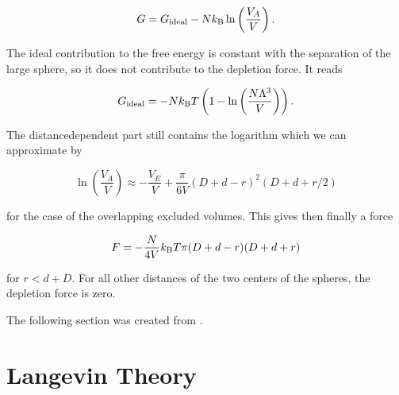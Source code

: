 \documentclass[letterpaper,10pt,english]{sphinxmanual}
\begin{document}
\sphinxAtStartPar
\begin{equation}
G=G_{\rm ideal}-Nk_{\rm B}\ln\left (\frac{V_{A}}{V}\right).
\end{equation}

\sphinxAtStartPar
The ideal contribution to the free energy is constant with the separation of the large sphere, so it does not contribute to the depletion force. It reads

\sphinxAtStartPar
\begin{equation}
G_{\rm ideal}=-Nk_{\rm B}T\left (1-\ln\left (\frac{N\Lambda^3}{V}\right)\right).
\end{equation}

\sphinxAtStartPar
The distance\sphinxhyphen{}dependent part still contains the logarithm which we can approximate by

\sphinxAtStartPar
\begin{equation}
\ln\left (\frac{V_{A}}{V}\right)\approx -\frac{V_{E}}{V}+\frac{\pi}{6V}(D+d-r)^2(D+d+r/2)
\end{equation}

\sphinxAtStartPar
for the case of the overlapping excluded volumes. This gives then finally a force

\sphinxAtStartPar
\begin{equation}
F=-\frac{N}{4V}k_{\rm B}T\pi(D+d-r)(D+d+r)
\end{equation}

\sphinxAtStartPar
for \(r<d+D\). For all other distances of the two centers of the spheres, the depletion force is zero.



\sphinxAtStartPar
The following section was created from .


\chapter{Langevin Theory}
\label{\detokenize{notebooks/L16/1_langevin:Langevin-Theory}}\label{\detokenize{notebooks/L16/1_langevin::doc}}
\end{document}
